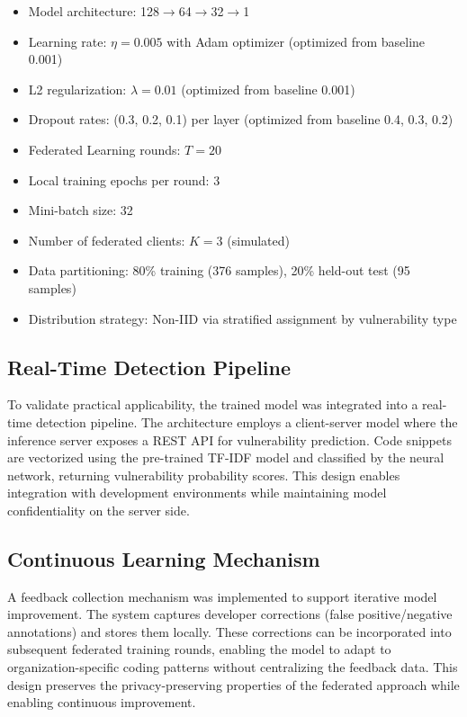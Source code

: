 \documentclass[conference]{IEEEtran}
\begin{document}
\begin{itemize}
    \item Model architecture: 128$\rightarrow$64$\rightarrow$32$\rightarrow$1
    \item Learning rate: $\eta = 0.005$ with Adam optimizer (optimized from baseline 0.001)
    \item L2 regularization: $\lambda = 0.01$ (optimized from baseline 0.001)
    \item Dropout rates: (0.3, 0.2, 0.1) per layer (optimized from baseline 0.4, 0.3, 0.2)
    \item Federated Learning rounds: $T = 20$
    \item Local training epochs per round: 3
    \item Mini-batch size: 32
    \item Number of federated clients: $K = 3$ (simulated)
    \item Data partitioning: 80\% training (376 samples), 20\% held-out test (95 samples)
    \item Distribution strategy: Non-IID via stratified assignment by vulnerability type
\end{itemize}

\subsection{Real-Time Detection Pipeline}

To validate practical applicability, the trained model was integrated into a real-time detection pipeline. The architecture employs a client-server model where the inference server exposes a REST API for vulnerability prediction. Code snippets are vectorized using the pre-trained TF-IDF model and classified by the neural network, returning vulnerability probability scores. This design enables integration with development environments while maintaining model confidentiality on the server side.

\subsection{Continuous Learning Mechanism}

A feedback collection mechanism was implemented to support iterative model improvement. The system captures developer corrections (false positive/negative annotations) and stores them locally. These corrections can be incorporated into subsequent federated training rounds, enabling the model to adapt to organization-specific coding patterns without centralizing the feedback data. This design preserves the privacy-preserving properties of the federated approach while enabling continuous improvement.
\end{document}
